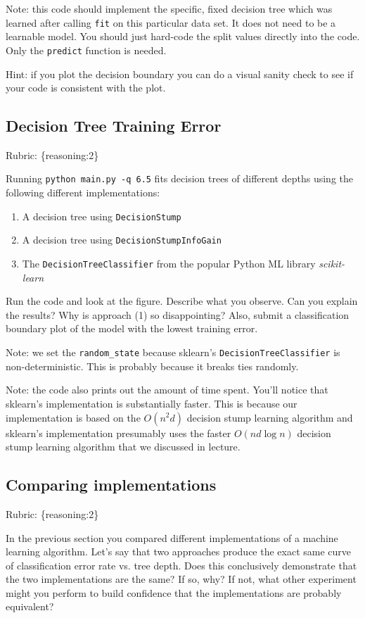 \documentclass{article}
\def\rubric#1{\gre{Rubric: \{#1\}}}{}
\def\blu#1{{\color{blu}#1}}
\def\gre#1{{\color{gre}#1}}
\def\enum#1{\begin{enumerate}#1\end{enumerate}}
\begin{document}
Note: this code should implement the specific, fixed decision tree
which was learned after calling \texttt{fit} on this particular data set. It does not need to be a learnable model.
You should just hard-code the split values directly into the code. Only the \texttt{predict} function is needed.

Hint: if you plot the decision boundary you can do a visual sanity check to see if your code is consistent with the plot.





\subsection{Decision Tree Training Error}
\rubric{reasoning:2}

Running \texttt{python main.py -q 6.5} fits decision trees of different depths using the following different implementations: 
\enum{
\item A decision tree using \texttt{DecisionStump}
\item A decision tree using \texttt{DecisionStumpInfoGain}
\item The \texttt{DecisionTreeClassifier} from the popular Python ML library \emph{scikit-learn}
}

Run the code and look at the figure.
\blu{Describe what you observe. Can you explain the results?} Why is approach (1) so disappointing? Also, \blu{submit a classification boundary plot of the model with the lowest training error}.

Note: we set the \verb|random_state| because sklearn's \texttt{DecisionTreeClassifier} is non-deterministic. This is probably
because it breaks ties randomly.

Note: the code also prints out the amount of time spent. You'll notice that sklearn's implementation is substantially faster. This is because
our implementation is based on the $O(n^2d)$ decision stump learning algorithm and sklearn's implementation presumably uses the faster $O(nd\log n)$
decision stump learning algorithm that we discussed in lecture.

\subsection{Comparing implementations}
\rubric{reasoning:2}

In the previous section you compared different implementations of a machine learning algorithm. Let's say that two
approaches produce the exact same curve of classification error rate vs. tree depth. Does this conclusively demonstrate
that the two implementations are the same? If so, why? If not, what other experiment might you perform to build confidence
that the implementations are probably equivalent?
\end{document}
